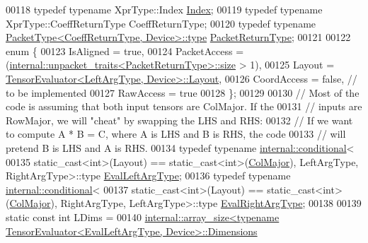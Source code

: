 \begin{DoxyCode}
00118   \textcolor{keyword}{typedef} \textcolor{keyword}{typename} XprType::Index \hyperlink{namespace_eigen_a62e77e0933482dafde8fe197d9a2cfde}{Index};
00119   \textcolor{keyword}{typedef} \textcolor{keyword}{typename} XprType::CoeffReturnType CoeffReturnType;
00120   \textcolor{keyword}{typedef} \textcolor{keyword}{typename} \hyperlink{group___sparse_core___module}{PacketType<CoeffReturnType, Device>::type} 
      \hyperlink{group___sparse_core___module}{PacketReturnType};
00121 
00122   \textcolor{keyword}{enum} \{
00123     IsAligned = \textcolor{keyword}{true},
00124     PacketAccess = (\hyperlink{struct_eigen_1_1internal_1_1unpacket__traits}{internal::unpacket\_traits<PacketReturnType>::size}
       > 1),
00125     Layout = \hyperlink{struct_eigen_1_1_tensor_evaluator}{TensorEvaluator<LeftArgType, Device>::Layout},
00126     CoordAccess = \textcolor{keyword}{false},  \textcolor{comment}{// to be implemented}
00127     RawAccess = \textcolor{keyword}{true}
00128   \};
00129 
00130   \textcolor{comment}{// Most of the code is assuming that both input tensors are ColMajor. If the}
00131   \textcolor{comment}{// inputs are RowMajor, we will "cheat" by swapping the LHS and RHS:}
00132   \textcolor{comment}{// If we want to compute A * B = C, where A is LHS and B is RHS, the code}
00133   \textcolor{comment}{// will pretend B is LHS and A is RHS.}
00134   \textcolor{keyword}{typedef} \textcolor{keyword}{typename} \hyperlink{struct_eigen_1_1internal_1_1conditional}{internal::conditional}<
00135     \textcolor{keyword}{static\_cast<}\textcolor{keywordtype}{int}\textcolor{keyword}{>}(Layout) == static\_cast<int>(\hyperlink{group__enums_ggaacded1a18ae58b0f554751f6cdf9eb13a0cbd4bdd0abcfc0224c5fcb5e4f6669a}{ColMajor}), LeftArgType, RightArgType>::type 
      \hyperlink{class_eigen_1_1internal_1_1_tensor_lazy_evaluator_writable}{EvalLeftArgType};
00136   \textcolor{keyword}{typedef} \textcolor{keyword}{typename} \hyperlink{struct_eigen_1_1internal_1_1conditional}{internal::conditional}<
00137     \textcolor{keyword}{static\_cast<}\textcolor{keywordtype}{int}\textcolor{keyword}{>}(Layout) == static\_cast<int>(\hyperlink{group__enums_ggaacded1a18ae58b0f554751f6cdf9eb13a0cbd4bdd0abcfc0224c5fcb5e4f6669a}{ColMajor}), RightArgType, LeftArgType>::type 
      \hyperlink{class_eigen_1_1internal_1_1_tensor_lazy_evaluator_writable}{EvalRightArgType};
00138 
00139   \textcolor{keyword}{static} \textcolor{keyword}{const} \textcolor{keywordtype}{int} LDims =
00140       
      \hyperlink{struct_eigen_1_1internal_1_1array__size}{internal::array\_size<typename TensorEvaluator<EvalLeftArgType, Device>::Dimensions}

\end{DoxyCode}

